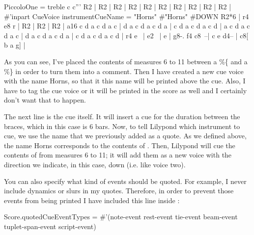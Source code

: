 \documentclass[../../LilyPond-Tutorials]{subfiles}
\begin{document}
\begin{lilypondcode}
PiccoloOne = {
       \clef treble
       \key c \major
       \relative c''' {
              \PersonalSettings
              R2 | %
              R2 | %
              R2 | %
              R2 | %
              R2 | %
                 R2 | %
                 R2 | %
                 R2 | %
                 R2 | %
                 R2 | %
              \tag #'inpart { \new CueVoice { \set instrumentCueName = "Horns" } }
              \cueDuring #"Horns" #DOWN { R2*6 } | %
              r4 e8 r | %
              R2 | %
              R2 | %
              R2 | %
              a16 c d a c d a c | %
              d a c d a c d a | %
              c d a c d a c d | %
              a c d a c d a c | %
              d a c d a c d a | %
              c d a c d a c d | %
              r4 e~ | %
              e2~ | %
              e | %
              g8-. f4 c8~--| %
              c e d4-- | %
              c8[ b a g] | %
       }
}
\end{lilypondcode}

As you can see, I've placed the contents of measures 6 to 11 between a \%\{ and a \%\} in order to turn them into a comment.
Then I have created a new cue voice with the name Horns, so that it this name will be printed above the cue.
Also, I have to tag the cue voice or it will be printed in the score as well and I certainly don't want that to happen.

The next line is the cue itself.
It will insert a cue for the duration between the braces, which in this case is 6 bars.
Now, to tell Lilypond which instrument to cue, we use the name that we previously added as a quote.
As we defined above, the name Horns corresponds to the contents of .
Then, Lilypond will cue the contents of  from measures 6 to 11; it will add them as a new voice with the direction we indicate, in this case, down (i.e. like voice two).

You can also specify what kind of events should be quoted.
For example, I never include dynamics or slurs in my quotes.
Therefore, in order to prevent those events from being printed I have included this line inside :

\begin{lilypondcode}
\set Score.quotedCueEventTypes = 
  #'(note-event rest-event tie-event beam-event tuplet-span-event script-event)
\end{lilypondcode}
\end{document}
